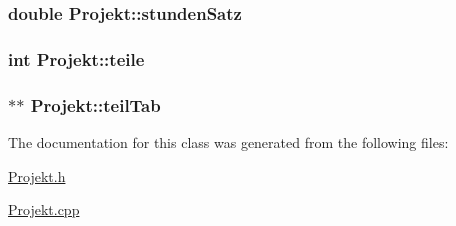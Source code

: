 \subsubsection[{stunden\+Satz}]{\setlength{\rightskip}{0pt plus 5cm}double Projekt\+::stunden\+Satz\hspace{0.3cm}{\ttfamily [private]}}\label{classProjekt_afac3a0828a5f2e976af1dbb46ac712ca}
\hypertarget{classProjekt_ac705642faf893d995f60f617183f0ed7}{}
\subsubsection[{teile}]{\setlength{\rightskip}{0pt plus 5cm}int Projekt\+::teile\hspace{0.3cm}{\ttfamily [private]}}\label{classProjekt_ac705642faf893d995f60f617183f0ed7}
\hypertarget{classProjekt_a14ba023886dcaffaddbebb7623b0067b}{}
\subsubsection[{teil\+Tab}]{$\ast$$\ast$ Projekt\+::teil\+Tab\hspace{0.3cm}{\ttfamily [private]}}\label{classProjekt_a14ba023886dcaffaddbebb7623b0067b}


The documentation for this class was generated from the following files\+:\begin{DoxyCompactItemize}
\item 
\hyperlink{Projekt_8h}{Projekt.\+h}\item 
\hyperlink{Projekt_8cpp}{Projekt.\+cpp}\end{DoxyCompactItemize}
